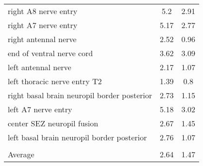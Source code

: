 \begin{tabular}{lcc}
 right A8 nerve entry                        & 5.2           & 2.91             \\
 right A7 nerve entry                        & 5.17          & 2.77             \\
 right antennal nerve                        & 2.52          & 0.96             \\
 end of ventral nerve cord                   & 3.62          & 3.09             \\
 left antennal nerve                         & 2.17          & 1.07             \\
 left thoracic nerve entry T2                & 1.39          & 0.8              \\
 right basal brain neuropil border posterior & 2.73          & 1.15             \\
 left A7 nerve entry                         & 5.18          & 3.02             \\
 center SEZ neuropil fusion                  & 2.67          & 1.45             \\
 left basal brain neuropil border posterior  & 2.76          & 1.07             \\
                                             &               &                  \\ \hline \hline
 Average                                     & 2.64          & 1.47             \\
\hline
\end{tabular}